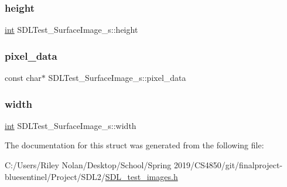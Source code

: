 \mbox{\label{struct_s_d_l_test___surface_image__s_a310092874695556e4b7f1f63aec24213}} 
\subsubsection{\texorpdfstring{height}{height}}
{\footnotesize\ttfamily \mbox{\hyperlink{warnings_8h_a74f207b5aa4ba51c3a2ad59b219a423b}{int}} S\+D\+L\+Test\+\_\+\+Surface\+Image\+\_\+s\+::height}

\mbox{\label{struct_s_d_l_test___surface_image__s_acf2d3006bea5690f564d3003d1512fa7}} 
\subsubsection{\texorpdfstring{pixel\_data}{pixel\_data}}
{\footnotesize\ttfamily const char$\ast$ S\+D\+L\+Test\+\_\+\+Surface\+Image\+\_\+s\+::pixel\+\_\+data}

\mbox{\label{struct_s_d_l_test___surface_image__s_a3cbacf6b015a22832ab4d3f509719609}} 
\subsubsection{\texorpdfstring{width}{width}}
{\footnotesize\ttfamily \mbox{\hyperlink{warnings_8h_a74f207b5aa4ba51c3a2ad59b219a423b}{int}} S\+D\+L\+Test\+\_\+\+Surface\+Image\+\_\+s\+::width}



The documentation for this struct was generated from the following file\+:\begin{DoxyCompactItemize}
\item 
C\+:/\+Users/\+Riley Nolan/\+Desktop/\+School/\+Spring 2019/\+C\+S4850/git/finalproject-\/bluesentinel/\+Project/\+S\+D\+L2/\mbox{\hyperlink{_s_d_l__test__images_8h}{S\+D\+L\+\_\+test\+\_\+images.\+h}}\end{DoxyCompactItemize}
